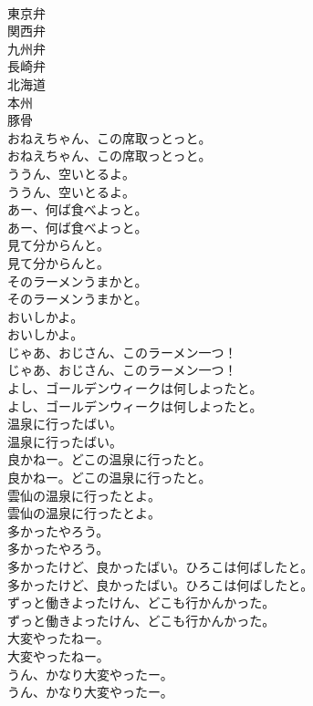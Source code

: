 \documentclass[8pt]{extreport}
\begin{document}
\begin{CJK}{UTF8}{min}
\\	東京弁
\\	関西弁
\\	九州弁
\\	長崎弁
\\	北海道
\\	本州
\\	豚骨
\\	おねえちゃん、この席取っとっと。	
\\	おねえちゃん、この席取っとっと。 
\\	ううん、空いとるよ。	
\\	ううん、空いとるよ。 
\\	あー、何ば食べよっと。	
\\	あー、何ば食べよっと。 
\\	見て分からんと。	
\\	見て分からんと。 
\\	そのラーメンうまかと。	
\\	そのラーメンうまかと。 
\\	おいしかよ。	
\\	おいしかよ。 
\\	じゃあ、おじさん、このラーメン一つ！	
\\	じゃあ、おじさん、このラーメン一つ！ 
\\	よし、ゴールデンウィークは何しよったと。	
\\	よし、ゴールデンウィークは何しよったと。 
\\	温泉に行ったばい。	
\\	温泉に行ったばい。 
\\	良かねー。どこの温泉に行ったと。	
\\	良かねー。どこの温泉に行ったと。 
\\	雲仙の温泉に行ったとよ。	
\\	雲仙の温泉に行ったとよ。 
\\	多かったやろう。	
\\	多かったやろう。 
\\	多かったけど、良かったばい。ひろこは何ばしたと。	
\\	多かったけど、良かったばい。ひろこは何ばしたと。 
\\	ずっと働きよったけん、どこも行かんかった。	
\\	ずっと働きよったけん、どこも行かんかった。 
\\	大変やったねー。	
\\	大変やったねー。 
\\	うん、かなり大変やったー。	
\\	うん、かなり大変やったー。 

\end{CJK}
\end{document}
